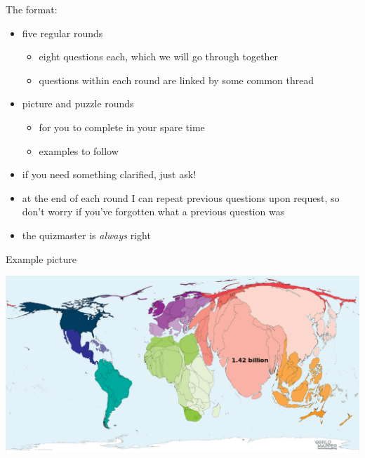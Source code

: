 \begin{frame}
   The format:
   \begin{itemize}[<+(1)->]
      \item five regular rounds
      \begin{itemize}
         \item eight questions each, which we will go through together
         \item questions within each round are linked by some common thread
      \end{itemize}
      \item picture and puzzle rounds
      \begin{itemize}
         \item for you to complete in your spare time
         \item examples to follow
      \end{itemize}
   \end{itemize}

   \begin{itemize}[<+(1)->]
      \item if you need something clarified, just ask!
      \item at the end of each round I can repeat previous questions upon request, so don't worry if you've forgotten what a previous question was
      \item the quizmaster is \emph{always} right
   \end{itemize}
\end{frame}

\begin{frame}
   Example picture

   \begin{center}
      \includegraphics[width=0.6\paperwidth]{maps/population.png}

   \end{center}
\end{frame}

